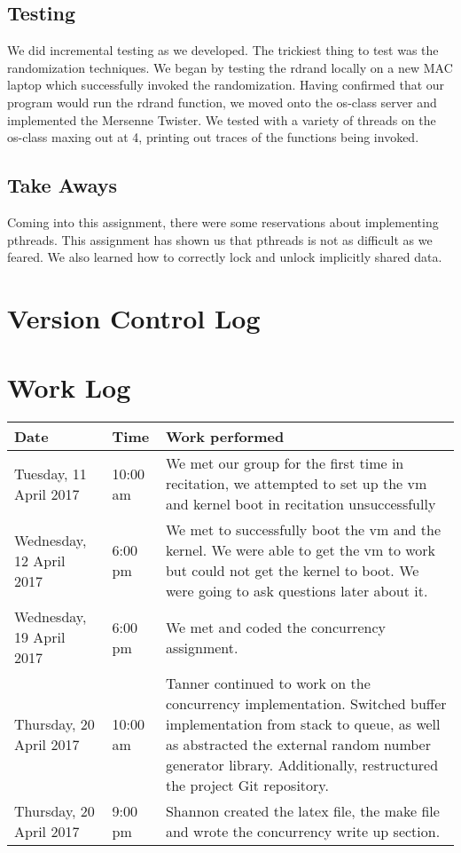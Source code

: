\documentclass[letterpaper,10pt,serif,draftclsnofoot,onecolumn,compsoc,titlepage]{article}%
\begin{document}
\subsection{Testing}
We did incremental testing as we developed. The trickiest thing to test was
the randomization techniques. We began by testing the rdrand locally on a
new MAC laptop which successfully invoked the randomization. Having
confirmed that our program would run the rdrand function, we moved onto
the os-class server and implemented the Mersenne Twister. We tested with a
variety of threads on the os-class maxing out at 4, printing out traces of
the functions being invoked.
\subsection{Take Aways}
Coming into this assignment, there were some reservations about implementing
 pthreads. This assignment has shown us that pthreads is not as difficult as
 we feared. We also learned how to correctly lock and unlock implicitly
 shared data.
\section{Version Control Log}

\section{Work Log}
\begin{tabular}{| p{4.5cm} | p{1.5cm} | p{10.5cm} |}
\hline
Date & Time & Work performed \\ \hline
Tuesday, 11 April 2017 & 10:00 am & We met our group for the first time in
 recitation, we attempted to set up the vm and kernel boot in recitation
  unsuccessfully \\ \hline
Wednesday, 12 April 2017 & 6:00 pm & We met to successfully boot the vm and
the kernel. We were able to get the vm to work but could not get the kernel
to boot. We were going to ask questions later about it.\\ \hline
Wednesday, 19 April 2017 & 6:00 pm & We met and coded the concurrency
assignment.\\ \hline
Thursday, 20 April 2017 & 10:00 am & Tanner continued to work on the
concurrency implementation. Switched buffer implementation from stack to
queue, as well as abstracted the external random number generator library.
Additionally, restructured the project Git repository. \\ \hline
Thursday, 20 April 2017 & 9:00 pm & Shannon created the latex file, the
make file and wrote the concurrency write up section. \\ \hline
\end{tabular}
\end{document}
